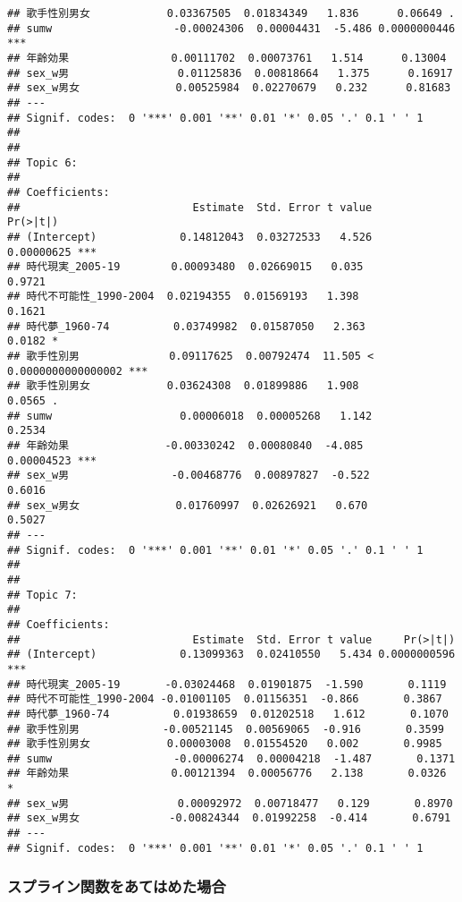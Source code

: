 \documentclass[
]{article}
\begin{document}
\begin{verbatim}
## 歌手性別男女            0.03367505  0.01834349   1.836      0.06649 .  
## sumw                   -0.00024306  0.00004431  -5.486 0.0000000446 ***
## 年齢効果                0.00111702  0.00073761   1.514      0.13004    
## sex_w男                 0.01125836  0.00818664   1.375      0.16917    
## sex_w男女               0.00525984  0.02270679   0.232      0.81683    
## ---
## Signif. codes:  0 '***' 0.001 '**' 0.01 '*' 0.05 '.' 0.1 ' ' 1
## 
## 
## Topic 6:
## 
## Coefficients:
##                           Estimate  Std. Error t value             Pr(>|t|)    
## (Intercept)             0.14812043  0.03272533   4.526           0.00000625 ***
## 時代現実_2005-19        0.00093480  0.02669015   0.035               0.9721    
## 時代不可能性_1990-2004  0.02194355  0.01569193   1.398               0.1621    
## 時代夢_1960-74          0.03749982  0.01587050   2.363               0.0182 *  
## 歌手性別男              0.09117625  0.00792474  11.505 < 0.0000000000000002 ***
## 歌手性別男女            0.03624308  0.01899886   1.908               0.0565 .  
## sumw                    0.00006018  0.00005268   1.142               0.2534    
## 年齢効果               -0.00330242  0.00080840  -4.085           0.00004523 ***
## sex_w男                -0.00468776  0.00897827  -0.522               0.6016    
## sex_w男女               0.01760997  0.02626921   0.670               0.5027    
## ---
## Signif. codes:  0 '***' 0.001 '**' 0.01 '*' 0.05 '.' 0.1 ' ' 1
## 
## 
## Topic 7:
## 
## Coefficients:
##                           Estimate  Std. Error t value     Pr(>|t|)    
## (Intercept)             0.13099363  0.02410550   5.434 0.0000000596 ***
## 時代現実_2005-19       -0.03024468  0.01901875  -1.590       0.1119    
## 時代不可能性_1990-2004 -0.01001105  0.01156351  -0.866       0.3867    
## 時代夢_1960-74          0.01938659  0.01202518   1.612       0.1070    
## 歌手性別男             -0.00521145  0.00569065  -0.916       0.3599    
## 歌手性別男女            0.00003008  0.01554520   0.002       0.9985    
## sumw                   -0.00006274  0.00004218  -1.487       0.1371    
## 年齢効果                0.00121394  0.00056776   2.138       0.0326 *  
## sex_w男                 0.00092972  0.00718477   0.129       0.8970    
## sex_w男女              -0.00824344  0.01992258  -0.414       0.6791    
## ---
## Signif. codes:  0 '***' 0.001 '**' 0.01 '*' 0.05 '.' 0.1 ' ' 1
\end{verbatim}

\hypertarget{ux30b9ux30d7ux30e9ux30a4ux30f3ux95a2ux6570ux3092ux3042ux3066ux306fux3081ux305fux5834ux5408}{%
\subsubsection{スプライン関数をあてはめた場合}\label{ux30b9ux30d7ux30e9ux30a4ux30f3ux95a2ux6570ux3092ux3042ux3066ux306fux3081ux305fux5834ux5408}}
\end{document}
